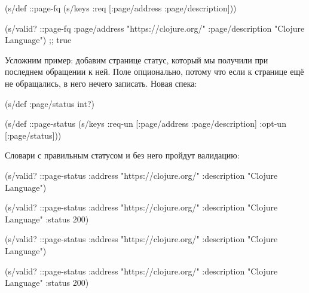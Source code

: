 \else

\begin{english}
  \begin{clojure}
(s/def ::page-fq
  (s/keys :req [:page/address
                :page/description]))

(s/valid? ::page-fq
          {:page/address "https://clojure.org/"
           :page/description "Clojure Language"})
;; true
  \end{clojure}
\end{english}

\fi

Усложним пример: добавим странице статус, который мы получили при
последнем обращении к ней. Поле опционально, потому что если к странице ещё не
обращались, в него нечего записать. Новая спека:

\begin{english}
  \begin{clojure}
(s/def :page/status int?)

(s/def ::page-status
  (s/keys :req-un [:page/address
                   :page/description]
          :opt-un [:page/status]))
  \end{clojure}
\end{english}

Словари с правильным статусом и без него пройдут валидацию:

\ifx\DEVICETYPE\MOBILE

\begin{english}
  \begin{clojure}
(s/valid? ::page-status
  {:address "https://clojure.org/"
   :description "Clojure Language"})

(s/valid? ::page-status
  {:address "https://clojure.org/"
   :description "Clojure Language"
   :status 200})
  \end{clojure}
\end{english}

\else

\begin{english}
  \begin{clojure}
(s/valid? ::page-status
          {:address "https://clojure.org/"
           :description "Clojure Language"})

(s/valid? ::page-status
          {:address "https://clojure.org/"
           :description "Clojure Language"
           :status 200})
  \end{clojure}
\end{english}

\fi

